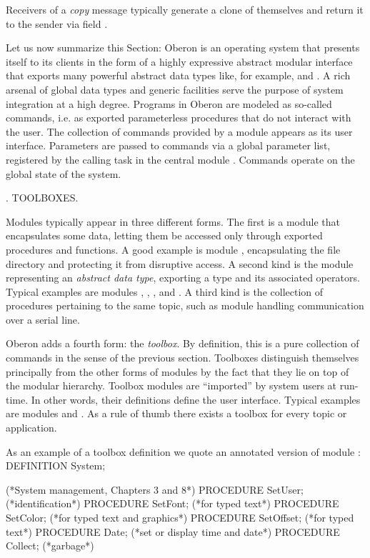 \noindent Receivers of a \emph{copy} message typically generate a clone of
themselves and return it to the sender via field .

Let us now summarize this Section: Oberon is an operating system that
presents itself to its clients in the form of a highly expressive
abstract modular interface that exports many powerful abstract data
types like, for example,  and . A rich arsenal of global
data types and generic facilities serve the purpose of system
integration at a high degree. Programs in Oberon are modeled as
so-called commands, i.e. as exported parameterless procedures that do
not interact with the user. The collection of commands provided by a
module appears as its user interface. Parameters are passed to
commands via a global parameter list, registered by the calling task
in the central module . Commands operate on the global state of
the system.

. TOOLBOXES.

Modules typically appear in three different forms. The first is a
module that encapsulates some data, letting them be accessed only
through exported procedures and functions. A good example is module
, encapsulating the file directory and protecting it from
disruptive access. A second kind is the module representing an
\emph{abstract data type}, exporting a type and its associated
operators. Typical examples are modules , , , and
. A third kind is the collection of procedures pertaining to the
same topic, such as module  handling communication over a serial
line.

Oberon adds a fourth form: the \emph{toolbox}. By definition, this is a pure
collection of commands in the sense of the previous section. Toolboxes
distinguish themselves principally from the other forms of modules by
the fact that they lie on top of the modular hierarchy. Toolbox
modules are ``imported'' by system users at run-time. In other words,
their definitions define the user interface. Typical examples are
modules  and . As a rule of thumb there exists a toolbox for
every topic or application.

As an example of a toolbox definition we quote an annotated version of
module :
\begintt
DEFINITION System;

(*System management, Chapters 3 and 8*)
  PROCEDURE SetUser; (*identification*)
  PROCEDURE SetFont; (*for typed text*)
  PROCEDURE SetColor; (*for typed text and graphics*)
  PROCEDURE SetOffset; (*for typed text*)
  PROCEDURE Date; (*set or display time and date*)
  PROCEDURE Collect; (*garbage*)
  

